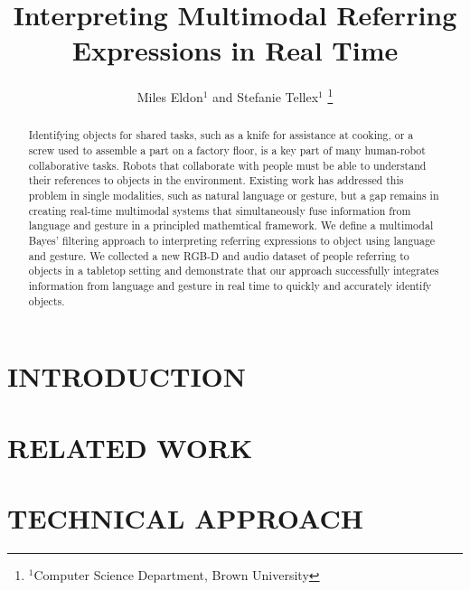 \documentclass[letterpaper, 10 pt, conference]{ieeeconf}
\title{\LARGE \bf
Interpreting Multimodal Referring Expressions in Real Time}
\author{Miles Eldon$^{1}$ and Stefanie Tellex$^{1}$
\thanks{$^{1}$Computer Science Department, Brown University}
}
\begin{document}
\maketitle
\thispagestyle{empty}
\pagestyle{empty}

\begin{abstract}
Identifying objects for shared tasks, such as a knife for assistance
at cooking, or a screw used to assemble a part on a factory floor, is
a key part of many human-robot collaborative tasks.  Robots that
collaborate with people must be able to understand their references to
objects in the environment.  Existing work has addressed this problem
in single modalities, such as natural language or gesture, but a gap
remains in creating real-time multimodal systems that simultaneously
fuse information from language and gesture in a principled mathemtical
framework.  We define a multimodal Bayes' filtering approach to
interpreting referring expressions to object using language and
gesture.  We collected a new RGB-D and audio dataset of people
referring to objects in a tabletop setting and demonstrate that our
approach successfully integrates information from language and gesture
in real time to quickly and accurately identify objects.
\end{abstract}

\section{INTRODUCTION}

\section{RELATED WORK}



\citep{matuszek12}

\section{TECHNICAL APPROACH}
\end{document}
